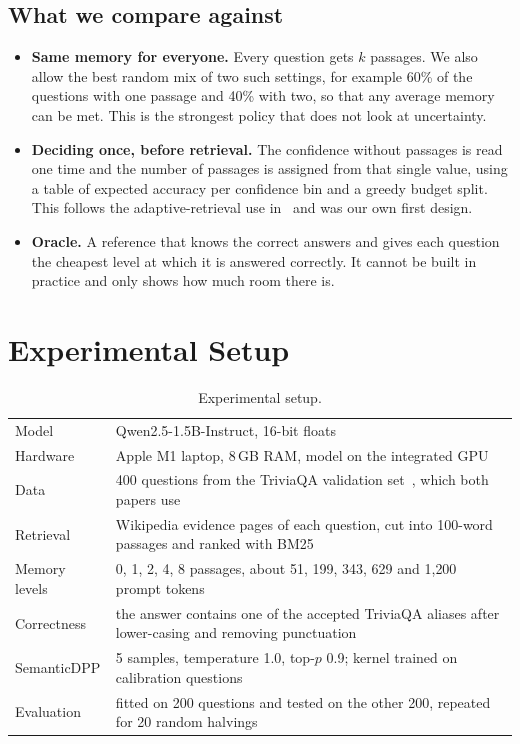 \documentclass[11pt,a4paper]{article}
\begin{document}
\subsection{What we compare against}

\begin{itemize}
\item \textbf{Same memory for everyone.} Every question gets $k$ passages. We
also allow the best random mix of two such settings, for example 60\% of the
questions with one passage and 40\% with two, so that any average memory can be
met. This is the strongest policy that does not look at uncertainty.
\item \textbf{Deciding once, before retrieval.} The confidence without passages
is read one time and the number of passages is assigned from that single value,
using a table of expected accuracy per confidence bin and a greedy budget
split. This follows the adaptive-retrieval use in~\cite{chen2026query} and was
our own first design.
\item \textbf{Oracle.} A reference that knows the correct answers and gives
each question the cheapest level at which it is answered correctly. It cannot
be built in practice and only shows how much room there is.
\end{itemize}

\section{Experimental Setup}

\begin{table}[H]
\centering
\small
\begin{tabular}{@{}p{3.2cm}p{11cm}@{}}
\toprule
Model & Qwen2.5-1.5B-Instruct, 16-bit floats \\
Hardware & Apple M1 laptop, 8\,GB RAM, model on the integrated GPU \\
Data & 400 questions from the TriviaQA validation set~\cite{joshi2017triviaqa}, which both papers use \\
Retrieval & Wikipedia evidence pages of each question, cut into 100-word passages and ranked with BM25 \\
Memory levels & 0, 1, 2, 4, 8 passages, about 51, 199, 343, 629 and 1{,}200 prompt tokens \\
Correctness & the answer contains one of the accepted TriviaQA aliases after lower-casing and removing punctuation \\
SemanticDPP & 5 samples, temperature 1.0, top-$p$ 0.9; kernel trained on calibration questions \\
Evaluation & fitted on 200 questions and tested on the other 200, repeated for 20 random halvings \\
\bottomrule
\end{tabular}
\caption{Experimental setup.}
\label{tab:setup}
\end{table}
\end{document}
